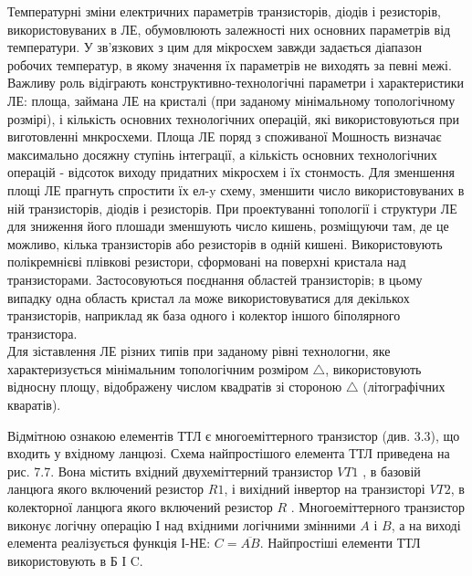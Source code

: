 \documentclass[a4paper,14pt]{extreport}
\begin{document}
  Температурні зміни електричних параметрів транзисторів, діодів і резисторів, використовуваних в ЛЕ, обумовлюють залежності них основних параметрів від температури. У зв'язкових з цим для
  мікросхем завжди задається діапазон робочих температур, в якому значення їх параметрів не виходять за певні межі.\\

  Важливу роль відіграють конструктивно-технологічні параметри
  і характеристики ЛЕ: площа, займана ЛЕ на кристалі (при заданому мінімальному топологічному розмірі), і кількість основних
  технологічних операцій, які використовуються при виготовленні мнкросхеми. Площа ЛЕ поряд з споживаної Мошность визначає максимально досяжну ступінь інтеграції, а кількість основних технологічних операцій - відсоток виходу придатних мікросхем і їх стонмость. Для зменшення площі ЛЕ прагнуть спростити їх ел-y схему, зменшити число використовуваних в ній транзисторів, діодів і резисторів. При проектуванні топології і структури ЛЕ для зниження його плошади зменшують число кишень, розміщуючи там,
  де це можливо, кілька транзисторів або резисторів в одній кишені. Використовують полікремнієві плівкові резистори, сформовані на поверхні кристала над транзисторами. Застосовуються поєднання областей транзисторів; в цьому випадку одна область кристал
  ла може використовуватися для декількох транзисторів, наприклад як база одного і колектор іншого біполярного транзистора.\\

  Для зіставлення ЛЕ різних типів при заданому рівні технологни, яке характеризується мінімальним топологічним розміром $\triangle$, використовують відносну площу, відображену числом квадратів зі стороною $\triangle$  (літографічних кваратів).
  \begin{center}
  \end{center}

  Відмітною ознакою елементів ТТЛ є многоеміттерного транзистор (див. 3.3), що входить у вхідному ланцюзі. Схема найпростішого елемента ТТЛ приведена на рис. 7.7. Вона містить вхідний двухеміттерний транзистор  
  $V T 1$ , в базовій ланцюга якого включений резистор $ R 1 $, і вихідний інвертор на транзисторі $ V T 2 $, в колекторної ланцюга якого включений резистор $ R $ . Многоеміттерного транзистор виконує логічну операцію І над вхідними логічними змінними $ A $ і $ B $, а на виході елемента реалізується функція І-НЕ:
  $ C = \overline{A B}. $ Найпростіші елементи ТТЛ використовують в Б І C.
\end{document}
